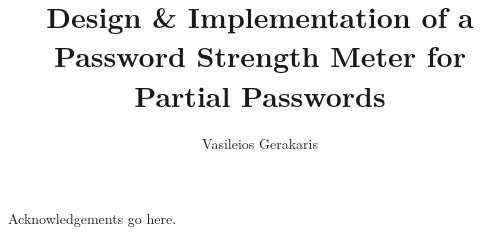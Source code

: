 \documentclass[msc, logo, parskip]{infthesis}  %
\title{Design \& Implementation of a Password Strength Meter for Partial Passwords}
\author{Vasileios Gerakaris}
\begin{document}
\begin{preliminary}

  \maketitle

  \begin{acknowledgements}
  Acknowledgements go here.
  \end{acknowledgements}

  \standarddeclaration


  \tableofcontents

\end{preliminary}







% 

\nocite{*}  %




\end{document}
